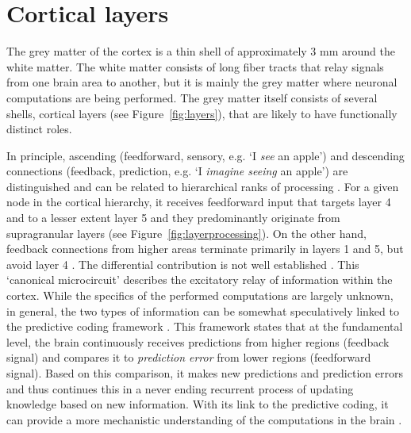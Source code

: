 \section*{Cortical layers}
The grey matter of the cortex is a thin shell of approximately 3 mm \cite{Zilles1990} around the white matter. The white matter consists of long fiber tracts that relay signals from one brain area to another, but it is mainly the grey matter where neuronal computations are being performed. The grey matter itself consists of several shells, cortical layers (see Figure~\ref{fig:layers}), that are likely to have functionally distinct roles.

In principle, ascending (feedforward, sensory, e.g. `I \emph{see} an apple') and descending connections (feedback, prediction, e.g. `I \emph{imagine seeing} an apple') are distinguished \cite{Rockland1979} and can be related to hierarchical ranks of processing \cite{Barone2000}. For a given node in the cortical hierarchy, it receives feedforward input that targets layer 4 and to a lesser extent layer 5 \cite{Constantinople2013} and they predominantly originate from supragranular layers (see Figure~\ref{fig:layerprocessing}). On the other hand, feedback connections from higher areas terminate primarily in layers 1 and 5, but avoid layer 4 \cite{Anderson2009}. The differential contribution is not well established \cite{Shipp2013}. This `canonical microcircuit' describes the excitatory relay of information within the cortex. While the specifics of the performed computations are largely unknown, in general, the two types of information can be somewhat speculatively linked to the predictive coding framework \cite{Friston2010}. This framework states that at the fundamental level, the brain continuously receives predictions from higher regions (feedback signal) and compares it to \emph{prediction error} from lower regions (feedforward signal). Based on this comparison, it makes new predictions and prediction errors and thus continues this in a never ending recurrent process of updating knowledge based on new information. With its link to the predictive coding, it can provide a more mechanistic understanding of the computations in the brain \cite{Shipp2016}.


